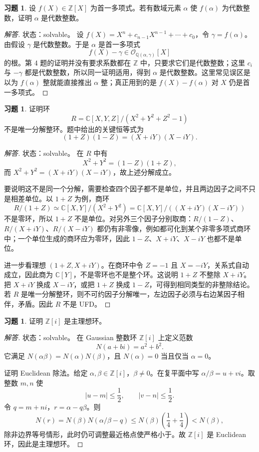 \documentclass[11pt,a4paper,openany]{ctexbook}
\numberwithin{equation}{chapter}
\newcommand{\Q}{\mathbb{Q}}
\newcommand{\C}{\mathbb{C}}
\newcommand{\Z}{\mathbb{Z}}
\theoremstyle{plain}
\theoremstyle{definition}
\newtheorem{exercise}[theorem]{习题}
\theoremstyle{remark}
\begin{document}
\begin{exercise}
设 $f(X)\in\Z[X]$ 为首一多项式。若有数域元素 $\alpha$ 使 $f(\alpha)$ 为代数整数，证明 $\alpha$ 是代数整数。
\end{exercise}

\begin{proof}[解答]
状态：solvable。
设 $f(X)=X^n+c_{n-1}X^{n-1}+\cdots+c_0$，令 $\gamma=f(\alpha)$。由假设 $\gamma$ 是代数整数。于是 $\alpha$ 是首一多项式
\[
f(X)-\gamma\in \mathcal O_{\Q(\alpha,\gamma)}[X]
\]
的根。第 4 题的证明并没有要求系数都在 $\Z$ 中，只要求它们是代数整数；这里 $c_i$ 与 $-\gamma$ 都是代数整数，所以同一证明适用，得到 $\alpha$ 是代数整数。这里常见误区是以为 $f(\alpha)$ 整就能直接推出 $\alpha$ 整；真正用到的是 $f(X)-f(\alpha)$ 对 $X$ 仍是首一多项式。
\end{proof}

\begin{exercise}
证明环
\[
R=\C[X,Y,Z]/(X^2+Y^2+Z^2-1)
\]
不是唯一分解整环。题中给出的关键恒等式为
\[
(1+Z)(1-Z)=(X+iY)(X-iY).
\]
\end{exercise}

\begin{proof}[解答]
状态：solvable。
在 $R$ 中有
\[
X^2+Y^2=(1-Z)(1+Z),
\]
而 $X^2+Y^2=(X+iY)(X-iY)$，故上述分解成立。

要说明这不是同一个分解，需要检查四个因子都不是单位，并且两边因子之间不只是相差单位。以 $1+Z$ 为例，商环
\[
R/(1+Z)\simeq \C[X,Y]/(X^2+Y^2)
=\C[X,Y]/((X+iY)(X-iY))
\]
不是零环，所以 $1+Z$ 不是单位。对另外三个因子分别取商：$R/(1-Z)$、$R/(X+iY)$、$R/(X-iY)$ 都仍有非零像，例如都可化到某个非零多项式商环中；一个单位生成的商环应为零环，因此 $1-Z$、$X+iY$、$X-iY$ 也都不是单位。

进一步看理想 $(1+Z,X+iY)$。在商环中令 $Z=-1$ 且 $X=-iY$，关系式自动成立，因此商为 $\C[Y]$，不是零环也不是整个环。这说明 $1+Z$ 不整除 $X+iY$。把 $X+iY$ 换成 $X-iY$，或把 $1+Z$ 换成 $1-Z$，可得到相同类型的非整除结论。若 $R$ 是唯一分解整环，则不可约因子分解唯一，左边因子必须与右边某因子相伴，矛盾。因此 $R$ 不是 UFD。
\end{proof}

\begin{exercise}
证明 $\Z[i]$ 是主理想环。
\end{exercise}

\begin{proof}[解答]
状态：solvable。
在 Gaussian 整数环 $\Z[i]$ 上定义范数
\[
N(a+bi)=a^2+b^2.
\]
它满足 $N(\alpha\beta)=N(\alpha)N(\beta)$，且 $N(\alpha)=0$ 当且仅当 $\alpha=0$。

证明 Euclidean 除法。给定 $\alpha,\beta\in\Z[i]$，$\beta\ne0$。在复平面中写 $\alpha/\beta=u+vi$。取整数 $m,n$ 使
\[
|u-m|\le\frac12,\qquad |v-n|\le\frac12.
\]
令 $q=m+ni$，$r=\alpha-q\beta$。则
\[
N(r)=N(\beta)N(\alpha/\beta-q)
\le N(\beta)\left(\frac14+\frac14\right)
<N(\beta),
\]
除非边界等号情形，此时仍可调整最近格点使严格小于。故 $\Z[i]$ 是 Euclidean 环，因此是主理想环。
\end{proof}
\end{document}
